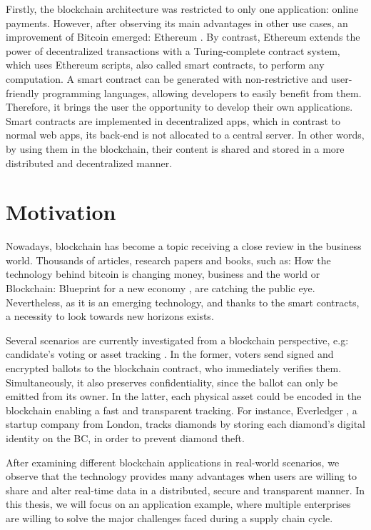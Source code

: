 Firstly, the blockchain architecture was restricted to only one application: online payments. However, after observing its main advantages in other use cases, an improvement of Bitcoin emerged: Ethereum \citep{buterin2014next}. By contrast, Ethereum extends the power of decentralized transactions with a Turing-complete contract system, which uses Ethereum scripts, also called smart contracts, to perform any computation. A smart contract can be generated with non-restrictive and user-friendly programming languages, allowing developers to easily benefit from them. Therefore, it brings the user the opportunity to develop their own applications. Smart contracts are implemented in decentralized apps, which in contrast to normal web apps, its back-end is not allocated to a central server. In other words, by using them in the blockchain, their content is shared and stored in a more distributed and decentralized manner.

\section{Motivation}

Nowadays, blockchain has become a topic receiving a close review in the business world. Thousands of articles, research papers and books, such as: How the technology behind bitcoin is changing money, business and the world \cite{tapscott2016blockchain} or Blockchain: Blueprint for a new economy \cite{swan2015blockchain}, are catching the public eye. Nevertheless, as it is an emerging technology, and thanks to the smart contracts, a necessity to look towards new horizons exists.

Several scenarios are currently investigated from a blockchain perspective, e.g: candidate's voting or asset tracking \cite{abeyratne2016blockchain}. In the former, voters send signed and encrypted ballots to the blockchain contract, who immediately verifies them. Simultaneously, it also preserves confidentiality, since the ballot can only be emitted from its owner. In the latter, each physical asset could be encoded in the blockchain enabling a fast and transparent tracking. For instance, Everledger \citep{lomas2015everledger}, a startup company from London, tracks diamonds by storing each diamond's digital identity on the BC, in order to prevent diamond theft.

After examining different blockchain applications in real-world scenarios, we observe that the technology provides many advantages when users are willing to share and alter real-time data in a distributed, secure and transparent manner. In this thesis, we will focus on an application example, where multiple enterprises are willing to solve the major challenges faced during a supply chain cycle.

